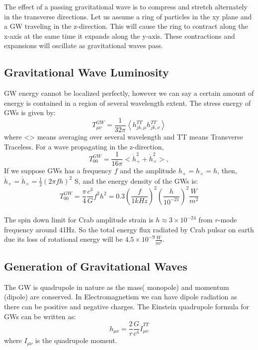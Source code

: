 \documentclass{ttuthes2007}
\begin{document}
	The effect of a passing gravitational wave is to compress and stretch
alternately in the transverse directions. Let us assume a ring of particles in
the xy
plane and a \ac{GW} traveling in the  z-direction. This will cause the
ring to contract along the x-axis at the same time it expands along the y-axis. These
contractions and expansions will oscillate as  gravitational waves pass. 

\subsection{Gravitational Wave Luminosity}
\ac{GW} energy cannot be localized perfectly,
however we can say a certain amount of energy is contained in a region of
several wavelength extent. The stress energy of \acp{GW} is given by:
\begin{equation}
T_{\mu\nu}^{GW} = \frac{1}{32\pi}\left\langle
h_{jk,\mu}^{TT}h_{jk,\nu}^{TT}\right\rangle
\end{equation}
where <> means averaging over several wavelength and TT means Transverse
Traceless.
For a wave propagating in the z-direction, 
\begin{equation}
T_{00}^{GW}=\frac{1}{16\pi}<\dot{h}_+^2+\dot{h}_\times ^2>,
\end{equation}
If we suppose \acp{GW} has a frequency $f$ and the amplitude $h_+ = h_\times = h$,
then, $\dot{h}_+ = \dot{h}_\times = \frac{1}{2}(2\pi fh)^2$
S, and the energy density of the \acp{GW} is:
\begin{equation}
T_{00}^{GW} = \frac{\pi}{4}\frac{c^3}{G}f^2 h^2=0.3\left(\frac{f}{1kHz}\right )^2
\left(\frac{h}{10^{-21}}\right )^2\frac{W}{m^2}
\end{equation}
\\
The spin down limit for Crab amplitude strain is $h\approx 3 \times 10^{-24}$
from
$r$-mode frequency around 41Hz. So the total energy flux radiated by Crab pulsar
on earth due its loss of rotational energy will be
$4.5\times10^{-9}\frac{W}{m^2}$.

\subsection{Generation of Gravitational Waves}

	The \ac{GW} is quadrupole in nature as the mass( monopole) and
momentum (dipole) are conserved. In Electromagnetism we can have dipole
radiation as there can be positive and negative charges.
The Einstein quadrupole formula for \acp{GW} can be written as:
\begin{equation}\label{eg:strainamplitude}
h_{\mu\nu}= \frac{2}{r}\frac{G}{c^4}\ddot{I}_{\mu\nu}^{TT}
\end{equation}
where $I_{\mu\nu}$ is the quadrupole moment.
\end{document}
